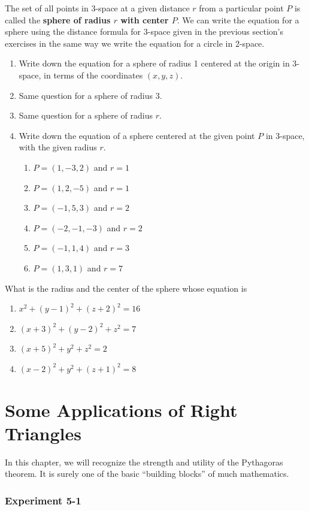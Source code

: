 \documentclass[12pt]{book} %
\begin{document}
\begin{ExerciseList}
The set of all points in 3-space at a given distance $r$ from a particular point $P$ is called the \textbf{sphere of radius $r$ with center $P$}. We can write the equation for a sphere using the distance formula for 3-space given in the previous section's exercises in the same way we write the equation for a circle in 2-space.
\begin{enumerate}
\item[(a)] Write down the equation for a sphere of radius 1 centered at the origin in 3-space, in terms of the coordinates $(x,y,z)$.
\item[(b)] Same question for a sphere of radius 3.
\item[(c)] Same question for a sphere of radius $r$.
\item[(d)] Write down the equation of a sphere centered at the given point $P$ in 3-space, with the given radius $r$.
\begin{enumerate}
\item[(i)] $P=(1,-3,2)$ and $r=1$
\item[(ii)] $P=(1,2,-5)$ and $r=1$
\item[(iii)] $P=(-1,5,3)$ and $r=2$
\item[(iv)] $P=(-2,-1,-3)$ and $r=2$
\item[(v)] $P=(-1,1,4)$ and $r=3$
\item[(vi)] $P=(1,3,1)$ and $r=7$
\end{enumerate}
\end{enumerate}

\Exercise What is the radius and the center of the sphere whose equation is
\begin{enumerate}
\item[(a)] $x^2+(y-1)^2+(z+2)^2=16$
\item[(b)] $(x+3)^2+(y-2)^2+z^2=7$
\item[(c)] $(x+5)^2+y^2+z^2=2$
\item[(d)] $(x-2)^2+y^2+(z+1)^2=8$
\end{enumerate}
\end{ExerciseList}

\chapter{Some Applications of Right Triangles}

In this chapter, we will recognize the strength and utility of the Pythagoras theorem. It is surely one of the basic ``building blocks'' of much mathematics.

\subsection*{Experiment 5-1}
\end{document}
